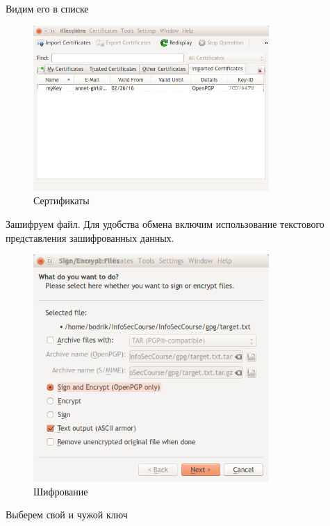 Видим его в списке

\begin{figure}[H]
	\centering
	\includegraphics[width=0.8\textwidth]{images/10.png}
	\caption{Сертификаты}
\end{figure}

Зашифруем файл. Для удобства обмена включим использование текстового представления зашифрованных данных.

\begin{figure}[H]
	\centering
	\includegraphics[width=0.8\textwidth]{images/11.png}
	\caption{Шифрование}
\end{figure}

Выберем свой и чужой ключ

